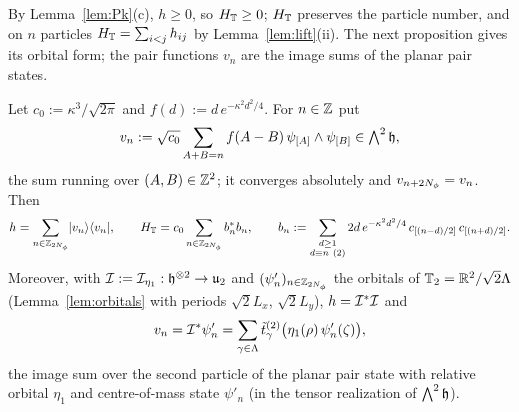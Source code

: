 By Lemma~\ref{lem:Pk}(c), $h\ge0$, so $H_{\mathbb{T}}\ge0$; $H_{\mathbb{T}}$ preserves the particle number, and on $n$ particles
$H_{\mathbb{T}}=\sum_{i<j}h_{ij}$ by Lemma~\ref{lem:lift}(ii). The next proposition gives its orbital form; the pair functions
$v_n$ are the image sums of the planar pair states.

\begin{proposition}\label{prop:orbital}
Let $c_0:=\kappa^3/\sqrt{2\pi}$ and $f(d):=d\,e^{-\kappa^2d^2/4}$. For $n\in\mathbb{Z}$ put
\begin{equation}\label{eq:vtau}
v_n:=\sqrt{c_0}\sum_{A+B=n}f(A-B)\,\psi_{[A]}\wedge\psi_{[B]}\in\textstyle\bigwedge^2\mathfrak{h},
\end{equation}
the sum running over $(A,B)\in\mathbb{Z}^2$; it converges absolutely and $v_{n+2N_{\phi}}=v_n$. Then
\begin{equation}\label{eq:horbital}
h=\sum_{n\in\mathbb{Z}_{2N_{\phi}}}\lvert v_n\rangle\langle v_n\rvert,\qquad
H_{\mathbb{T}}=c_0\sum_{n\in\mathbb{Z}_{2N_{\phi}}}b_{n}^*b_{n},\qquad b_{n}:=\sum_{\substack{d\ge1\\ d\equiv n\ (2)}}2d\,e^{-\kappa^2d^2/4}\,
c_{[(n-d)/2]}\,c_{[(n+d)/2]} .
\end{equation}
Moreover, with $\mathcal{I}:=\mathcal{I}_{\eta_1}:\mathfrak{h}^{\otimes2}\to\mathfrak{u}_2$ and $(\psi'_n)_{n\in\mathbb{Z}_{2N_{\phi}}}$ the orbitals of
$\mathbb{T}_2=\mathbb{R}^2/\sqrt2\Lambda$ (Lemma~\ref{lem:orbitals} with periods $\sqrt2L_x$, $\sqrt2L_y$), $h=\mathcal{I}^*\mathcal{I}$ and
\begin{equation}\label{eq:imagesum}
v_n=\mathcal{I}^*\psi'_n=\sum_{\gamma\in\Lambda}\tilde t^{(2)}_\gamma\bigl(\eta_1(\rho)\,\psi'_n(\zeta)\bigr),
\end{equation}
the image sum over the second particle of the planar pair state with relative orbital $\eta_1$ and centre-of-mass
state $\psi'_n$ (in the tensor realization of $\bigwedge^2\mathfrak{h}$).
\end{proposition}

